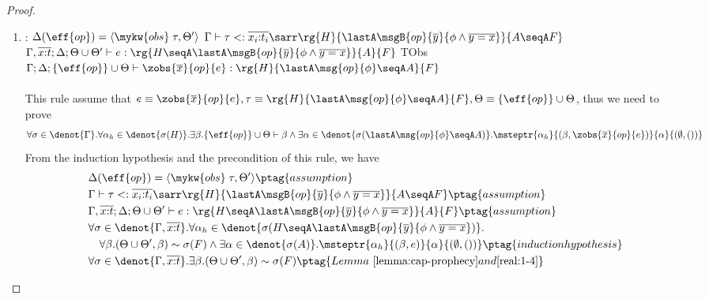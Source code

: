 \begin{proof}
\begin{enumerate}[label=Case]
\item:
{\footnotesize
\mprooftr{80mm}
{
  $\Delta(\eff{op}) =\langle \mykw{obs}\;\tau, \Theta'\rangle$ \quad
$\Gamma \vdash \tau <: \overline{x_i{:}t_i}\sarr
\rg{H}{\lastA\msgB{op}{\overline{y}}{\phi \land \overline{y = x}}}{A \seqA F}$ \quad
 $\Gamma, \overline{x{:}t}; \Delta; \Theta \cup \Theta' \vdash e : \rg{H \seqA \lastA\msgB{op}{\overline{y}}{\phi \land \overline{y = x}}}{A}{F}$
 }
{TObs}
{$\Gamma; \Delta; \{\eff{op}\} \cup \Theta \vdash \zobs{\overline{x}}{op}{e} : \rg{H}{\lastA\msg{op}{\phi}\seqA A}{F}$}
\ \\ \ \\}
This rule assume that $e \equiv \zobs{\overline{x}}{op}{e}, \tau \equiv\rg{H}{\lastA\msg{op}{\phi} \seqA A}{F}, \Theta \equiv \{\eff{op}\} \cup \Theta$, thus we need to prove
{\footnotesize\begin{align*}
     \forall \sigma \in \denot{\Gamma}.\forall \alpha_h \in \denot{\sigma(H)}. \exists \beta. \{\eff{op}\} \cup \Theta \vdash \beta \land \exists \alpha \in\denot{\sigma(\lastA\msg{op}{\phi} \seqA A)}. \msteptr{\alpha_h}{(\beta, \zobs{\overline{x}}{op}{e})}{\alpha}{(\emptyset, ())}
\end{align*}}\noindent
From the induction hypothesis and the precondition of this rule, we have
{\footnotesize\begin{alignat}{2}
\setcounter{equation}{0}
&\Delta(\eff{op}) =\langle \mykw{obs}\;\tau, \Theta' \rangle \ptag{assumption} \label{real:2-1} \\
&\Gamma \vdash \tau <: \overline{x_i{:}t_i}\sarr\rg{H}{\lastA\msgB{op}{\overline{y}}{\phi \land \overline{y = x}}}{A \seqA F} \ptag{assumption} \label{real:2-2} \\
&\Gamma, \overline{x{:}t}; \Delta; \Theta \cup \Theta' \vdash e : \rg{H \seqA \lastA\msgB{op}{\overline{y}}{\phi \land \overline{y = x}}}{A}{F} \ptag{assumption} \label{real:2-3} \\
&\forall \sigma \in \denot{\Gamma, \overline{x{:}t}}.\forall \alpha_h \in \denot{\sigma(H \seqA \lastA\msgB{op}{\overline{y}}{\phi \land \overline{y = x}})}. \notag
\\&\quad \forall \beta. (\Theta \cup \Theta', \beta) \sim \sigma(F) \land \exists \alpha \in\denot{\sigma(A)}. \msteptr{\alpha_h}{(\beta, e)}{\alpha}{(\emptyset, ())}
\ptag{induction hypothesis} \label{real:2-4}
\\&\forall \sigma \in\denot{\Gamma, \overline{x{:}t}}. \exists \beta. (\Theta \cup \Theta', \beta) \sim \sigma(F) \ptag{Lemma~\ref{lemma:cap-prophecy} and \ref{real:1-4}} \label{real:2-5}

\end{alignat}}
\end{enumerate}
\end{proof}
